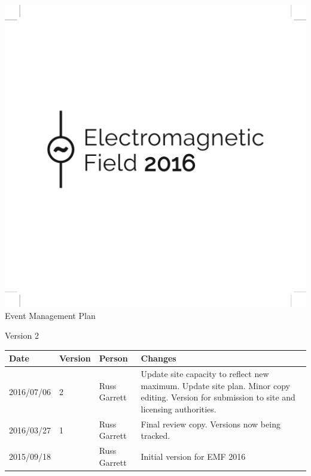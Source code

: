 

\newcommand{\st}{\superscript{st} }
\newcommand{\nd}{\superscript{nd} }
\renewcommand{\th}{\superscript{th} }




\begin{titlepage}
\thispagestyle{empty}
\begin{center}
\includegraphics{emf-logo.pdf}\\[48pt]
{\Large Event Management Plan}

Version 2

\vfill

\begin{tabular}{l | l | l | p{10cm}}
  Date & Version & Person & Changes \\
  \hline
  2016/07/06 & 2 & Russ Garrett & Update site capacity to reflect new maximum. Update site plan. Minor copy editing. Version for submission to site and licensing authorities.\\
  \hline
  2016/03/27 & 1 & Russ Garrett & Final review copy. Versions now being tracked. \\
  \hline
  2015/09/18 &  & Russ Garrett & Initial version for EMF 2016 \\
\end{tabular}

\end{center}
\end{titlepage}

\tableofcontents

\newpage



